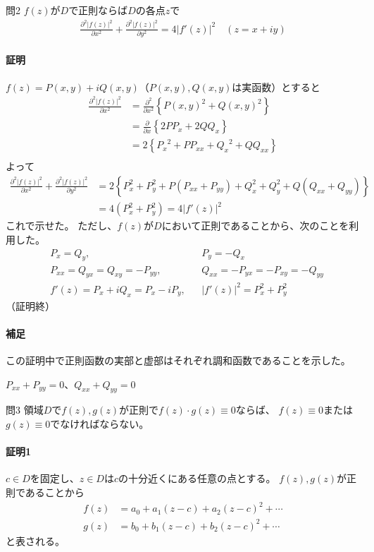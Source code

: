 \begin{mysimplebox}{問2}
    $f(z)$が$D$で正則ならば$D$の各点$z$で
    \begin{align*}
     \frac{\partial^2|f(z)|^2}{\partial x^2}
     +\frac{\partial^2|f(z)|^2}{\partial y^2}
     =4|f'(z)|^2\quad(z=x+iy)
    \end{align*}
\end{mysimplebox}
\paragraph{証明}
$f(z)=P(x,y)+iQ(x,y)$（$P(x,y),Q(x,y)$は実函数）とすると
\begin{align*}
    \frac{\partial^2|f(z)|^2}{\partial x^2}
   &=\frac{\partial^2}{\partial x^2}\left\{P(x,y)^2+Q(x,y)^2\right\}\\
   &=\frac{\partial}{\partial x}\left\{2PP_x+2QQ_x\right\}\\
   &=2\left\{{P_x}^2+PP_{xx}+{Q_x}^2+QQ_{xx}\right\}\\
\end{align*}
よって
\begin{align*}
    \frac{\partial^2|f(z)|^2}{\partial x^2}
     +\frac{\partial^2|f(z)|^2}{\partial y^2}
     &=2\left\{P_x^2+P_y^2+P(P_{xx}+P_{yy})+Q_x^2+Q_y^2+Q(Q_{xx}+Q_{yy})\right\}\\
     &=4(P_x^2+P_y^2)=4|f'(z)|^2
\end{align*}
これで示せた。
ただし、$f(z)$が$D$において正則であることから、次のことを利用した。
\begin{align*}
    &P_x=Q_y,& &P_y=-Q_x\\
    &P_{xx}=Q_{yx}=Q_{xy}=-P_{yy},    & &Q_{xx}=-P_{yx}=-P_{xy}=-Q_{yy}\\
    &f'(z)=P_x+iQ_x=P_x-iP_y,& &|f'(z)|^2=P_x^2+P_y^2
\end{align*}
（証明終）

\paragraph{補足}
この証明中で正則函数の実部と虚部はそれぞれ調和函数であることを示した。

$P_{xx}+P_{yy}=0$、$Q_{xx}+Q_{yy}=0$

\begin{mysimplebox}{問3}
    領域$D$で$f(z),g(z)$が正則で$f(z)\cdot g(z)\equiv0$ならば、
    $f(z)\equiv0$または$g(z)\equiv0$でなければならない。
\end{mysimplebox}
\paragraph{証明1}
$c\in D$を固定し、$z\in D$は$c$の十分近くにある任意の点とする。
$f(z),g(z)$が正則であることから
\begin{align*}
    f(z)&=a_0+a_1(z-c)+a_2(z-c)^2+\cdots\\
    g(z)&=b_0+b_1(z-c)+b_2(z-c)^2+\cdots
\end{align*}
と表される。

